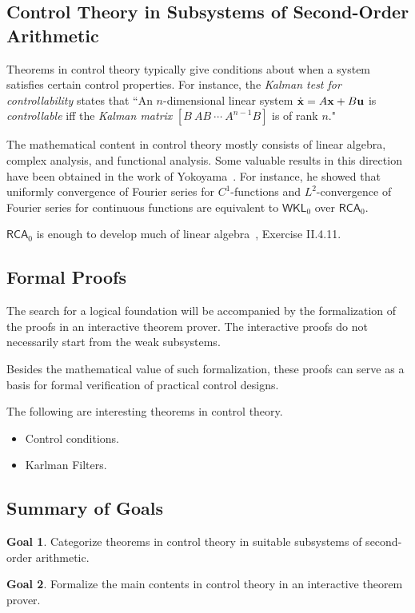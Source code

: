 \documentclass[10pt]{article}
\theoremstyle{definition}
\newtheorem{goal}{Goal}
\begin{document}
\subsection{Control Theory in Subsystems of Second-Order Arithmetic} 

Theorems in control theory typically give conditions about when a system satisfies certain control properties. For instance, the {\em Kalman test for controllability} states that ``An $n$-dimensional linear system $\dot {\bf x} = A{\bf x}+B{\bf u}$ is {\em controllable} iff the {\em Kalman matrix}
$[B\ AB\ \cdots\ A^{n-1}B]$ is of rank $n$." 

The mathematical content in control theory mostly consists of linear algebra, complex analysis, and functional analysis. Some valuable results in this direction have been obtained in the work of Yokoyama~\cite{yoko}. For instance, he showed that uniformly convergence of Fourier series for $C^1$-functions and $L^2$-convergence of Fourier series for continuous functions are equivalent to $\mathsf{WKL}_0$ over $\mathsf{RCA}_0$. 

$\mathsf{RCA}_0$ is enough to develop much of linear algebra~\cite{}, Exercise II.4.11. 

\subsection{Formal Proofs}

The search for a logical foundation will be accompanied by the formalization of the proofs in an interactive theorem prover. The interactive proofs do not necessarily start from the weak subsystems. 


Besides the mathematical value of such formalization, these proofs can serve as a basis for formal verification of practical control designs. 

The following are interesting theorems in control theory. 
\begin{itemize}
\item Control conditions. 
\item Karlman Filters. 
\end{itemize}

\subsection{Summary of Goals}

\begin{goal}
Categorize theorems in control theory in suitable subsystems of second-order arithmetic. 
\end{goal}
\begin{goal}
Formalize the main contents in control theory in an interactive theorem prover.  
\end{goal}
\end{document}
